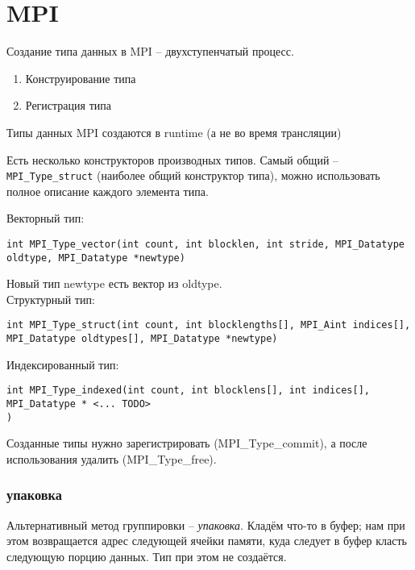 \documentclass[main.tex]{subfiles}
\begin{document}
	\section{MPI}
	
Создание типа данных в MPI -- двухступенчатый процесс.
\begin{enumerate}[noitemsep]
	\item Конструирование типа
	\item Регистрация типа
\end{enumerate}

Типы данных MPI создаются в runtime (а не во время трансляции)

Есть несколько конструкторов производных типов.
Самый общий -- \texttt{MPI\_Type\_struct} (наиболее общий конструктор типа), можно использовать полное описание каждого элемента типа.

Векторный тип:

\begin{verbatim}
int MPI_Type_vector(int count, int blocklen, int stride, MPI_Datatype oldtype, MPI_Datatype *newtype)
\end{verbatim}

Новый тип newtype есть вектор из oldtype. \\

Структурный тип:

\begin{verbatim}
int MPI_Type_struct(int count, int blocklengths[], MPI_Aint indices[], MPI_Datatype oldtypes[], MPI_Datatype *newtype)
\end{verbatim}

Индексированный тип:

\begin{verbatim}
int MPI_Type_indexed(int count, int blocklens[], int indices[], MPI_Datatype * <... TODO>
)
\end{verbatim}

Созданные типы нужно зарегистрировать (MPI\_Type\_commit),  а после использования удалить (MPI\_Type\_free).

\subsubsection{упаковка}

Альтернативный метод группировки -- \emph{упаковка}.
Кладём что-то в буфер; нам при этом возвращается адрес следующей ячейки памяти, куда следует в буфер класть следующую порцию данных.
Тип при этом не создаётся.
\end{document}
